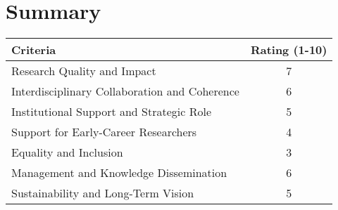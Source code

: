 \documentclass{article}
\begin{document}
\section{Summary}

\begin{center}
\begin{tabular}{| m{6cm} | c |}
\hline
\textbf{Criteria} & \textbf{Rating (1-10)} \\ 
\hline
Research Quality and Impact & 7 \\ 
\hline
Interdisciplinary Collaboration and Coherence & 6 \\ 
\hline
Institutional Support and Strategic Role & 5 \\ 
\hline
Support for Early-Career Researchers & 4 \\ 
\hline
Equality and Inclusion & 3 \\ 
\hline
Management and Knowledge Dissemination & 6 \\ 
\hline
Sustainability and Long-Term Vision & 5 \\ 
\hline
\end{tabular}
\end{center}
\end{document}
